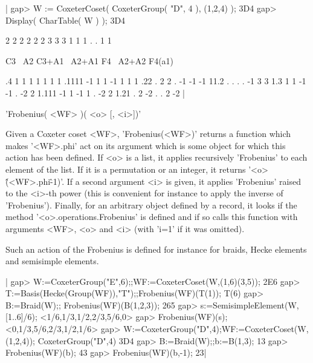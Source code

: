 |    gap> W := CoxeterCoset( CoxeterGroup( "D", 4 ), (1,2,4) );
    3D4
    gap> Display( CharTable( W ) );
    3D4

           2  2   2     2      2  2      3      3
           3  1   1     1      .  .      1      1

             C3 ~A2 C3+A1 ~A2+A1 F4 ~A2+A2 F4(a1)

    .4        1   1     1      1  1      1      1
    .1111    -1   1     1     -1  1      1      1
    .22       .   2     2      . -1     -1     -1
    11.2      .   .     .      . -1      3      3
    1.3       1   1    -1     -1  .     -2      2
    1.111    -1   1    -1      1  .     -2      2
    1.21      .   2    -2      .  .      2     -2
    |


'Frobenius( <WF> )( <o> [, <i>])'

Given  a  Coxeter  coset  <WF>,  'Frobenius(<WF>)' returns a function which
makes  '<WF>.phi' act on its  argument which is some  object for which this
action  has  been  defined.  If  <o>  is  a  list,  it  applies recursively
'Frobenius'  to each  element of  the list.  If it  is a  permutation or an
integer,  it  returns  '<o>\^(<WF>.phi\^-1)'.  If  a second argument <i> is
given,  it  applies  'Frobenius'  raised  to  the  <i>-th  power  (this  is
convenient  for instance to apply the inverse of 'Frobenius'). Finally, for
an   arbitrary  object  defined  by  a  record,  it  looks  if  the  method
'<o>.operations.Frobenius'  is defined and  if so calls  this function with
arguments <WF>, <o> and <i> (with 'i=1' if it was omitted).

Such  an action of the Frobenius is  defined for instance for braids, Hecke
elements and semisimple elements.

|    gap> W:=CoxeterGroup("E",6);;WF:=CoxeterCoset(W,(1,6)(3,5));
    2E6
    gap> T:=Basis(Hecke(Group(WF)),"T");;Frobenius(WF)(T(1));
    T(6)
    gap> B:=Braid(W);; Frobenius(WF)(B(1,2,3));
    265
    gap> s:=SemisimpleElement(W,[1..6]/6);
    <1/6,1/3,1/2,2/3,5/6,0>
    gap> Frobenius(WF)(s);
    <0,1/3,5/6,2/3,1/2,1/6>
    gap> W:=CoxeterGroup("D",4);WF:=CoxeterCoset(W,(1,2,4));
    CoxeterGroup("D",4)
    3D4
    gap> B:=Braid(W);;b:=B(1,3);
    13
    gap> Frobenius(WF)(b);
    43
    gap> Frobenius(WF)(b,-1);
    23|


